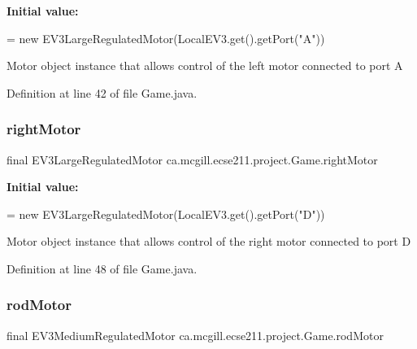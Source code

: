 {\bfseries Initial value\+:}
\begin{DoxyCode}
=
      \textcolor{keyword}{new} EV3LargeRegulatedMotor(LocalEV3.get().getPort(\textcolor{stringliteral}{"A"}))
\end{DoxyCode}
Motor object instance that allows control of the left motor connected to port A 

Definition at line 42 of file Game.\+java.

\mbox{\label{classca_1_1mcgill_1_1ecse211_1_1project_1_1_game_a637614c1eb769dcdb09d897c66e453a2}} 
\subsubsection{\texorpdfstring{right\+Motor}{rightMotor}}
{\footnotesize\ttfamily final E\+V3\+Large\+Regulated\+Motor ca.\+mcgill.\+ecse211.\+project.\+Game.\+right\+Motor\hspace{0.3cm}{\ttfamily [static]}}

{\bfseries Initial value\+:}
\begin{DoxyCode}
=
      \textcolor{keyword}{new} EV3LargeRegulatedMotor(LocalEV3.get().getPort(\textcolor{stringliteral}{"D"}))
\end{DoxyCode}
Motor object instance that allows control of the right motor connected to port D 

Definition at line 48 of file Game.\+java.

\mbox{\label{classca_1_1mcgill_1_1ecse211_1_1project_1_1_game_ad3c828a8e12ad3eaab01d2d846a3716f}} 
\subsubsection{\texorpdfstring{rod\+Motor}{rodMotor}}
{\footnotesize\ttfamily final E\+V3\+Medium\+Regulated\+Motor ca.\+mcgill.\+ecse211.\+project.\+Game.\+rod\+Motor\hspace{0.3cm}{\ttfamily [static]}}

